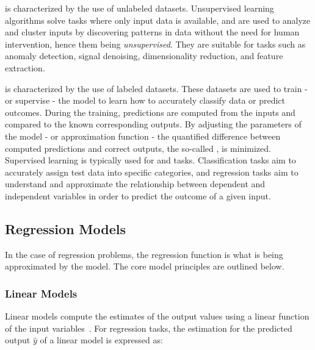  is characterized by the use of unlabeled datasets.
Unsupervised learning algorithms solve tasks where only input data is available, and are used to analyze and cluster inputs by discovering patterns in data without the need for human intervention, hence them being \textit{unsupervised}.
They are suitable for tasks such as anomaly detection, signal denoising, dimensionality reduction, and feature extraction.

 is characterized by the use of labeled datasets.
These datasets are used to train - or supervise - the model to learn how to accurately classify data or predict outcomes.
During the training, predictions are computed from the inputs and compared to the known corresponding outputs.
By adjusting the parameters of the model - or approximation function - the quantified difference between computed predictions and correct outputs, the so-called , is minimized.
Supervised learning is typically used for  and  tasks.
Classification tasks aim to accurately assign test data into specific categories, and regression tasks aim to understand and approximate the relationship between dependent and independent variables in order to predict the outcome of a given input.

\subsection{Regression Models}

In the case of regression problems, the regression function is what is being approximated by the model.
The core model principles are outlined below.

\subsubsection*{Linear Models}

Linear models compute the estimates of the output values using a linear function of the input variables~\cite{PNAS:Lai:Strong_Consistency_Least_Squares_Estimates_Regression_Models}.
For regression tasks, the estimation for the predicted output \(\hat{y}\) of a linear model is expressed as:

